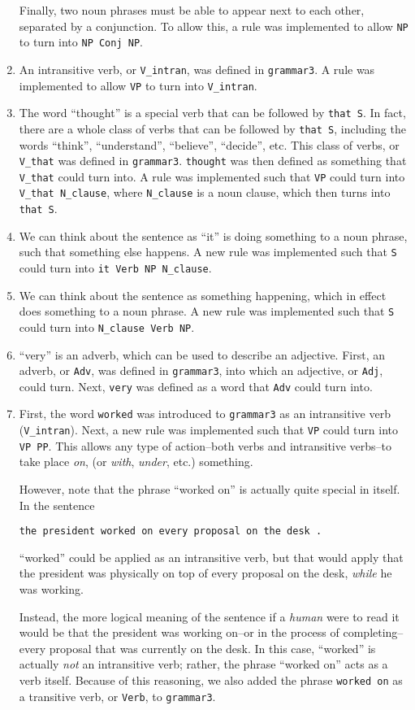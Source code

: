 \documentclass[11pt]{article}
\newcommand{\code}[1]{\texttt{#1}}
\begin{document}
\begin{enumerate}
	Finally, two noun phrases must be able to appear next to each other, separated by a conjunction. To allow this, a rule was implemented to allow \code{NP} to turn into \code{NP Conj NP}.
\item 
	An intransitive verb, or \code{V\_intran}, was defined in \code{grammar3}. A rule was implemented to allow \code{VP} to turn into \code{V\_intran}.
\item 
	The word ``thought'' is a special verb that can be followed by \code{that S}. In fact, there are a whole class of verbs that can be followed by \code{that S}, including the words ``think'', ``understand'', ``believe'', ``decide'', etc. This class of verbs, or \code{V\_that} was defined in \code{grammar3}. \code{thought} was then defined as something that \code{V\_that} could turn into. A rule was implemented such that \code{VP} could turn into \code{V\_that N\_clause}, where \code{N\_clause} is a noun clause, which then turns into \code{that S}.
\item 
	We can think about the sentence as ``it'' is doing something to a noun phrase, such that something else happens. A new rule was implemented such that \code{S} could turn into \code{it Verb NP N\_clause}.
\item 
	We can think about the sentence as something happening, which in effect does something to a noun phrase. A new rule was implemented such that \code{S} could turn into \code{N\_clause Verb NP}.
\item 
	``very'' is an adverb, which can be used to describe an adjective. First, an adverb, or \code{Adv}, was defined in \code{grammar3}, into which an adjective, or \code{Adj}, could turn. Next, \code{very} was defined as a word that \code{Adv} could turn into.
\item
	First, the word \code{worked} was introduced to \code{grammar3} as an intransitive verb (\code{V\_intran}). Next, a new rule was implemented such that \code{VP} could turn into \code{VP PP}. This allows any type of action--both verbs and intransitive verbs--to take place \textit{on}, (or \textit{with}, \textit{under}, etc.) something.
	
	However, note that the phrase ``worked on'' is actually quite special in itself. In the sentence
	
	\code{the president worked on every proposal on the desk .}
	
	``worked'' could be applied as an intransitive verb, but that would apply that the president was physically on top of every proposal on the desk, \textit{while} he was working. 
	
	Instead, the more logical meaning of the sentence if a \textit{human} were to read it would be that the president was working on--or in the process of completing--every proposal that was currently on the desk. In this case, ``worked'' is actually \textit{not} an intransitive verb; rather, the phrase ``worked on'' acts as a verb itself. Because of this reasoning, we also added the phrase \code{worked on} as a transitive verb, or \code{Verb}, to \code{grammar3}.
\end{enumerate} 
\end{document}

